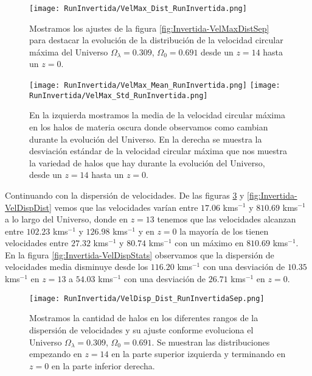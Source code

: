\begin{figure}[H]
    \centering
    \texttt{[image: RunInvertida/VelMax\_Dist\_RunInvertida.png]}
    \caption[Distribución de la velocidad circular máxima]{\footnotesize Mostramos los ajustes de la figura \ref{fig:Invertida-VelMaxDistSep} para destacar la evolución de la distribución de la velocidad circular máxima del Universo $\Omega_\lambda = 0.309 $, $\Omega_0 = 0.691$ desde un $z=14$ hasta un $z=0$.}
    \label{fig:Invertida-VelMaxDist}
\end{figure}

\begin{figure}[H]
    \centering
    \texttt{[image: RunInvertida/VelMax\_Mean\_RunInvertida.png]}
    \texttt{[image: RunInvertida/VelMax\_Std\_RunInvertida.png]}
    \caption[Media y desviación estándar de la velocidad circular máxima]{\footnotesize En la izquierda mostramos la media de la velocidad circular máxima en los halos de materia oscura donde observamos como cambian durante la evolución del Universo. En la derecha se muestra la desviación estándar de la velocidad circular máxima que nos muestra la variedad de halos que hay durante la evolución del Universo, desde un $z=14$ hasta un $z=0$.}
    \label{fig:Invertida-VelMaxStats}
\end{figure}

Continuando con la dispersión de velocidades. De las figuras \ref{fig:Invertida-VelDispDistSep} y \ref{fig:Invertida-VelDispDist} vemos que las velocidades varían entre $17.06$ kms$^{-1}$ y $810.69$ kms$^{-1}$ a lo largo del Universo, donde en $z=13$ tenemos que las velocidades alcanzan entre $102.23$ kms$^{-1}$ y $126.98$ kms$^{-1}$ y en $z=0$ la mayoría de los tienen velocidades entre $27.32$ kms$^{-1}$ y $80.74$ kms$^{-1}$ con un máximo en $810.69$ kms$^{-1}$. En la figura \ref{fig:Invertida-VelDispStats} observamos que la dispersión de velocidades media disminuye desde los $116.20$ kms$^{-1}$ con una desviación de $10.35$ kms$^{-1}$ en $z=13$ a $54.03$ kms$^{-1}$ con una desviación de $26.71$ kms$^{-1}$ en $z=0$.

\begin{figure}[H]
    \centering
    \texttt{[image: RunInvertida/VelDisp\_Dist\_RunInvertidaSep.png]}
    \caption[Dispersión de velocidades]{\footnotesize Mostramos la cantidad de halos en los diferentes rangos de la dispersión de velocidades y su ajuste conforme evoluciona el Universo $\Omega_\lambda = 0.309 $, $\Omega_0 = 0.691$. Se muestran las distribuciones empezando en $z=14$ en la parte superior izquierda y terminando en $z=0$ en la parte inferior derecha.}
    \label{fig:Invertida-VelDispDistSep}
\end{figure}

